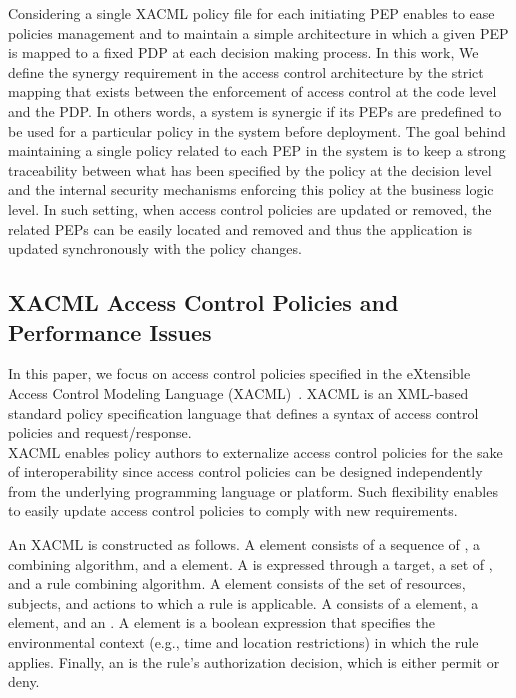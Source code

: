 Considering a single XACML policy file for each initiating PEP enables to ease policies management and to maintain a simple architecture 
in which a given PEP is mapped to a fixed PDP at each decision making process. In this work, We define the synergy requirement in the access control 
architecture by the strict mapping that exists between the enforcement of access control at the code level and the PDP. In others words, a system is synergic if 
its PEPs are predefined to be used for a particular policy in the system before deployment. 
The goal behind maintaining a single policy related to each PEP in the system is to keep a strong traceability between what has been specified by the 
policy at the decision level and the internal security mechanisms enforcing this policy at the business logic level. In such setting, 
when access control policies are updated or removed, the related PEPs can be easily located and removed and thus the application is updated synchronously 
with the policy changes. 

\subsection{XACML Access Control Policies and Performance Issues}

In this paper, we focus on access control policies specified in the eXtensible Access Control Modeling Language (XACML)~\cite{sunxacml}.
XACML is an XML-based standard policy specification language that defines a syntax of access control policies and
request/response. \\XACML enables policy authors to externalize access control policies for the sake of interoperability since access control policies can be designed 
independently from the underlying programming language or platform. Such flexibility enables to easily update access control policies to comply with new requirements.

An XACML is constructed as follows.
A  element consists of a sequence of , a combining algorithm, and
a  element. A  is expressed through a target, a set of , and a rule combining algorithm. 
A  element consists of the set of resources, subjects, and actions to which a rule is applicable. A  consists of a 
 element, a  element, and an . A  element is a boolean expression that specifies the
environmental context (e.g., time and location restrictions) in which the rule applies.
Finally, an  is the rule's authorization decision, which is either permit or deny.

